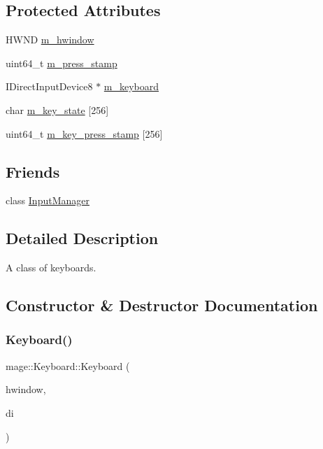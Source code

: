 \subsection*{Protected Attributes}
\begin{DoxyCompactItemize}
\item 
H\+W\+ND \hyperlink{classmage_1_1_keyboard_aa7196c689dad6f5aaf35e3929de02791}{m\+\_\+hwindow}
\item 
uint64\+\_\+t \hyperlink{classmage_1_1_keyboard_a2c638a93d1f61d9d3578a0df8b6a1c39}{m\+\_\+press\+\_\+stamp}
\item 
I\+Direct\+Input\+Device8 $\ast$ \hyperlink{classmage_1_1_keyboard_ae1325369d4863cc36ec1a0359dbf27fb}{m\+\_\+keyboard}
\item 
char \hyperlink{classmage_1_1_keyboard_ad3361790f2c9cc5ca19161f0c8e24acd}{m\+\_\+key\+\_\+state} \mbox{[}256\mbox{]}
\item 
uint64\+\_\+t \hyperlink{classmage_1_1_keyboard_a8eb4ce7e4e2395bb27d2ac9236655335}{m\+\_\+key\+\_\+press\+\_\+stamp} \mbox{[}256\mbox{]}
\end{DoxyCompactItemize}
\subsection*{Friends}
\begin{DoxyCompactItemize}
\item 
class \hyperlink{classmage_1_1_keyboard_af0e8c3dcc20b7ddcaf63506363a22821}{Input\+Manager}
\end{DoxyCompactItemize}


\subsection{Detailed Description}
A class of keyboards. 

\subsection{Constructor \& Destructor Documentation}
\hypertarget{classmage_1_1_keyboard_ac89c8f4132508901ff2ca57c68709928}{}\label{classmage_1_1_keyboard_ac89c8f4132508901ff2ca57c68709928} 
\subsubsection{\texorpdfstring{Keyboard()}{Keyboard()}}
{\footnotesize\ttfamily mage\+::\+Keyboard\+::\+Keyboard (\begin{DoxyParamCaption}\item[{H\+W\+ND}]{hwindow,  }\item[{I\+Direct\+Input8 $\ast$}]{di }\end{DoxyParamCaption})\hspace{0.3cm}{\ttfamily [protected]}}

